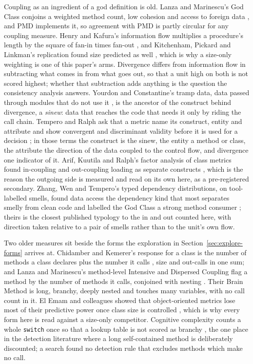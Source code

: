 \documentclass[11pt,a4paper]{article}
\begin{document}
Coupling as an ingredient of a god definition is old. Lanza and Marinescu's
God Class conjoins a weighted method count, low cohesion and access to
foreign data \cite{lanza2006, marinescu2004}, and PMD implements it, so
agreement with PMD is partly circular for any coupling measure. Henry and
Kafura's information flow multiplies a procedure's length by the square of
fan-in times fan-out \cite{henry1981}, and Kitchenham, Pickard and Linkman's
replication found size predicted as well \cite{kitchenham1990}, which is
why a size-only weighting is one of this paper's arms. Divergence differs
from information flow in subtracting what comes in from what goes out, so
that a unit high on both is not scored highest; whether that subtraction
adds anything is the question the consistency analysis answers. Yourdon and
Constantine's tramp data, data passed through modules that do not use it
\cite{yourdon1979}, is the ancestor of the construct behind divergence, a
\emph{sinew}: data that reaches the code that needs it only by riding the
call chain. Tempero and Ralph ask that a metric name its construct, entity
and attribute and show convergent and discriminant validity before it is
used for a decision \cite{tempero2026metrics}; in those terms the construct
is the sinew, the entity a method or class, the attribute the direction of
the data coupled to the control flow, and divergence one indicator of it.
Arif, Kuutila and Ralph's factor analysis of class metrics found in-coupling
and out-coupling loading as separate constructs \cite{arif2026}, which is
the reason the outgoing side is measured and read on its own here, as a
pre-registered secondary. Zhang, Wen and Tempero's typed dependency
distributions, on tool-labelled smells, found data access the dependency
kind that most separates smelly from clean code and labelled the God Class a
strong method consumer \cite{zhang2025deps}; theirs is the closest published
typology to the in and out counted here, with direction taken relative to a
pair of smells rather than to the unit's own flow.

Two older measures sit beside the forms the exploration in
Section~\ref{sec:explore-forms} arrives at. Chidamber and Kemerer's
response for a class is the number of methods a class declares plus the
number it calls \cite{ck1994}, size and out-calls in one sum; and Lanza and
Marinescu's method-level Intensive and Dispersed Coupling flag a method by
the number of methods it calls, conjoined with nesting
\cite{lanza2006}. Their Brain Method is long, branchy, deeply nested and
touches many variables, with no call count in it. El Emam and colleagues
showed that object-oriented metrics lose most of their predictive power once
class size is controlled \cite{elemam2001}, which is why every form here is
read against a size-only competitor. Cognitive complexity counts a whole
\texttt{switch} once so that a lookup table is not scored as branchy
\cite{campbell2018}, the one place in the detection literature where a long
self-contained method is deliberately discounted; a search found no
detection rule that excludes methods which make no call.
\end{document}
